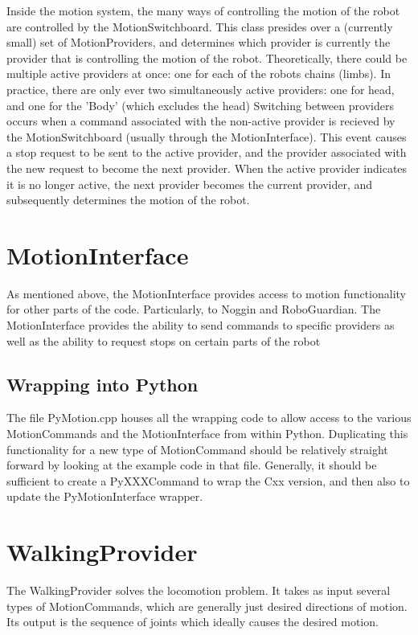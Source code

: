 \documentclass[11pt]{article}
\begin{document}
Inside the motion system, the many ways of controlling the motion of the robot
are controlled by the MotionSwitchboard. This class presides over a (currently
small) set of MotionProviders, and determines which provider is currently the
provider that is controlling the motion of the robot.  Theoretically, there
could be multiple active providers at once: one for each of the robots chains
(limbs). In practice, there are only ever two simultaneously active providers:
one for head, and one for the 'Body' (which excludes the head)
Switching between providers occurs when a command associated with the non-active
provider is recieved by the MotionSwitchboard (usually through the
MotionInterface). This event causes a stop request to be sent to the active
provider, and the provider associated with the new request to become the
next provider.  When the active provider indicates it is no longer active,
the next provider becomes the current provider, and subsequently determines
the motion of the robot.

\section{MotionInterface}
As mentioned above, the MotionInterface provides access to motion functionality
for other parts of the code. Particularly, to Noggin and RoboGuardian.
The MotionInterface provides the ability to send commands to specific providers
as well as the ability to request stops on certain parts of the robot

\subsection{Wrapping into Python}
The file PyMotion.cpp houses all the wrapping code to allow access to the
various MotionCommands and the MotionInterface from within Python.  Duplicating
this functionality for a new type of MotionCommand should be relatively straight
forward by looking at the example code in that file.  Generally, it should be
sufficient to create a PyXXXCommand to wrap the Cxx version, and then also
to update the PyMotionInterface wrapper.

\section{WalkingProvider}
The WalkingProvider solves the locomotion problem. It takes as input several
types of MotionCommands, which are generally just desired directions of motion.
Its output is the sequence of joints which ideally causes the desired motion.
\end{document}
